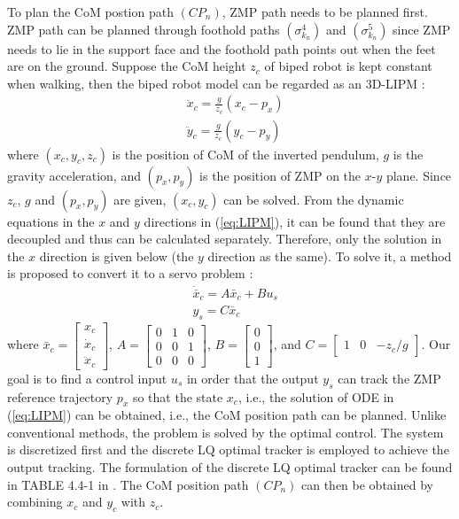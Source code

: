 \documentclass[journal,12pt,onecolumn,draftclsnofoot,]{IEEEtran}
\begin{document}
To plan the CoM postion path $(CP_n)$, ZMP path needs to be planned first. ZMP path can be planned through foothold paths $(\sigma^{4}_{k_n})$ and $(\sigma^{5}_{k_n})$ since ZMP needs to lie in the support face and the foothold path points out when the feet are on the ground. Suppose the CoM height $z_c$ of biped robot is kept constant when walking, then the biped robot model can be regarded as an 3D-LIPM \cite{kajita2001real}:
\begin{equation} \label{eq:LIPM}
    \begin{split}
        & \ddot{x}_c = \frac{g}{z_c}(x_c - p_x) \\
        & \ddot{y}_c = \frac{g}{z_c}(y_c - p_y)
    \end{split}
\end{equation}
where $(x_c, y_c, z_c)$ is the position of CoM of the inverted pendulum, $g$ is the gravity acceleration, and $(p_x,p_y)$ is the position of ZMP on the $x$-$y$ plane. Since $z_c$, $g$ and $(p_x,p_y)$ are given, $(x_c, y_c)$ can be solved. From the dynamic equations in the $x$ and $y$ directions in (\ref{eq:LIPM}), it can be found that they are decoupled and thus can be calculated separately. Therefore, only the solution in the $x$ direction is given below (the $y$ direction as the same). To solve it, a method is proposed to convert it to a servo problem \cite{1241826}:
\begin{equation} \label{eq:output tracking}
    \begin{split}
        & \dot{\bar{x}}_c = A\bar{x}_c + Bu_s \\
        & y_s = C\bar{x}_c
    \end{split}
\end{equation}
where $\bar{x}_c = \begin{bmatrix}
    x_c \\ \dot{x}_c \\ \ddot{x}_c
\end{bmatrix}$, $A = \begin{bmatrix}
    0 & 1 & 0 \\ 0 & 0 & 1 \\ 0 & 0 & 0
\end{bmatrix}$, $B = \begin{bmatrix}
    0 \\ 0 \\ 1
\end{bmatrix}$, and $C = \begin{bmatrix}
    1 & 0 & -z_c/g
\end{bmatrix}$. Our goal is to find a control input $u_s$ in order that the output $y_s$ can track the ZMP reference trajectory $p_x$ so that the state $x_c$, i.e., the solution of ODE in (\ref{eq:LIPM}) can be obtained, i.e., the CoM position path can be planned. Unlike conventional methods, the problem is solved by the optimal control. The system is discretized first and the discrete LQ optimal tracker is employed to achieve the output tracking. The formulation of the discrete LQ optimal tracker can be found in TABLE 4.4-1 in \cite{lewis2012optimal}. The CoM position path $(CP_n)$ can then be obtained by combining $x_c$ and $y_c$ with $z_c$.
\end{document}
